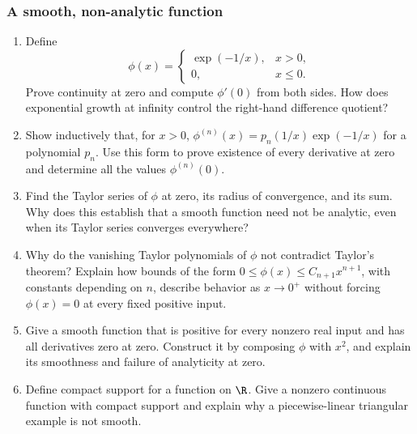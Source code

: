 \subsubsection*{A smooth, non-analytic function}
\begin{enumerate}[resume]
  \item Define
    \[
      \phi(x)=
      \begin{cases}
        \exp(-1/x),&x>0,\\
        0,&x\leq0.
      \end{cases}
    \]
    Prove continuity at zero and compute \(\phi'(0)\) from both
    sides. How does exponential growth at infinity control the
    right-hand difference quotient?

  \item Show inductively that, for \(x>0\),
    \(\phi^{(n)}(x)=p_n(1/x)\exp(-1/x)\) for a polynomial \(p_n\).
    Use this form to prove existence of every derivative at zero
    and determine all the values \(\phi^{(n)}(0)\).

  \item Find the Taylor series of \(\phi\) at zero, its radius of
    convergence, and its sum. Why does this establish that a smooth
    function need not be analytic, even when its Taylor series converges
    everywhere?

  \item Why do the vanishing Taylor polynomials of \(\phi\) not
    contradict Taylor's theorem? Explain how bounds of the form
    \(0\leq\phi(x)\leq C_{n+1}x^{n+1}\), with constants depending
    on \(n\), describe behavior as \(x\to0^+\) without forcing
    \(\phi(x)=0\) at every fixed positive input.

  \item Give a smooth function that is positive for every nonzero
    real input and has all derivatives zero at zero.
    Construct it by composing \(\phi\) with \(x^2\), and explain
    its smoothness and failure of analyticity at zero.

  \item Define compact support for a function on \(\R\).
    Give a nonzero continuous function with compact support and
    explain why a piecewise-linear triangular example is not smooth.


\end{enumerate}
